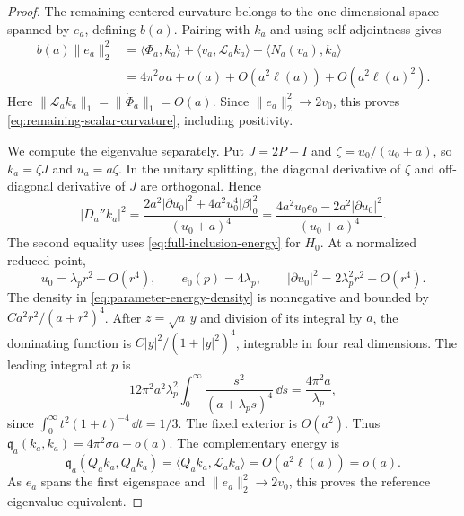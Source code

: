 \begin{proof}
The remaining centered curvature belongs to the
one-dimensional space spanned by \(e_a\), defining \(b(a)\).
Pairing with \(k_a\) and using self-adjointness gives
\begin{align*}
 b(a)\|e_a\|_2^2
 &=\langle\Phi_a,k_a\rangle
   +\langle v_a,\mathcal L_ak_a\rangle
   +\langle N_a(v_a),k_a\rangle\\
 &=4\pi^2\sigma a+o(a)+O(a^2\ell(a))+O(a^2\ell(a)^2).
\end{align*}
Here \(\|\mathcal L_ak_a\|_1=\|\dot\Phi_a\|_1=O(a)\).
Since \(\|e_a\|_2^2\to2v_0\), this proves
\eqref{eq:remaining-scalar-curvature}, including positivity.

We compute the eigenvalue separately. Put \(J=2P-I\) and
\(\zeta=u_0/(u_0+a)\), so \(k_a=\zeta J\) and \(u_a=a\zeta\).
In the unitary splitting, the diagonal derivative of \(\zeta\)
and off-diagonal derivative of \(J\) are orthogonal. Hence
\begin{equation}\label{eq:parameter-energy-density}
 |D_a''k_a|^2
 =\frac{2a^2|\partial u_0|^2+4a^2u_0^4|\beta|_0^2}{(u_0+a)^4}
 =\frac{4a^2u_0e_0-2a^2|\partial u_0|^2}{(u_0+a)^4}.
\end{equation}
The second equality uses \eqref{eq:full-inclusion-energy}
for \(H_0\). At a normalized reduced point,
\[
 u_0=\lambda_pr^2+O(r^4),\qquad
 e_0(p)=4\lambda_p,\qquad
 |\partial u_0|^2=2\lambda_p^2r^2+O(r^4).
\]
The density in \eqref{eq:parameter-energy-density} is
nonnegative and bounded by \(Ca^2r^2/(a+r^2)^4\).
After \(z=\sqrt a\,y\) and division of its integral by \(a\),
the dominating function is
\(C|y|^2/(1+|y|^2)^4\), integrable in four real dimensions.
The leading integral at \(p\) is
\[
 12\pi^2a^2\lambda_p^2
 \int_0^\infty\frac{s^2}{(a+\lambda_ps)^4}\,\dd s
 =\frac{4\pi^2a}{\lambda_p},
\]
since \(\int_0^\infty t^2(1+t)^{-4}\,\dd t=1/3\).
The fixed exterior is \(O(a^2)\). Thus
\(\mathfrak q_a(k_a,k_a)=4\pi^2\sigma a+o(a)\).
The complementary energy is
\[
 \mathfrak q_a(Q_ak_a,Q_ak_a)
 =\langle Q_ak_a,\mathcal L_ak_a\rangle
 =O(a^2\ell(a))=o(a).
\]
As \(e_a\) spans the first eigenspace and
\(\|e_a\|_2^2\to2v_0\), this proves the reference eigenvalue
equivalent.


\end{proof}
